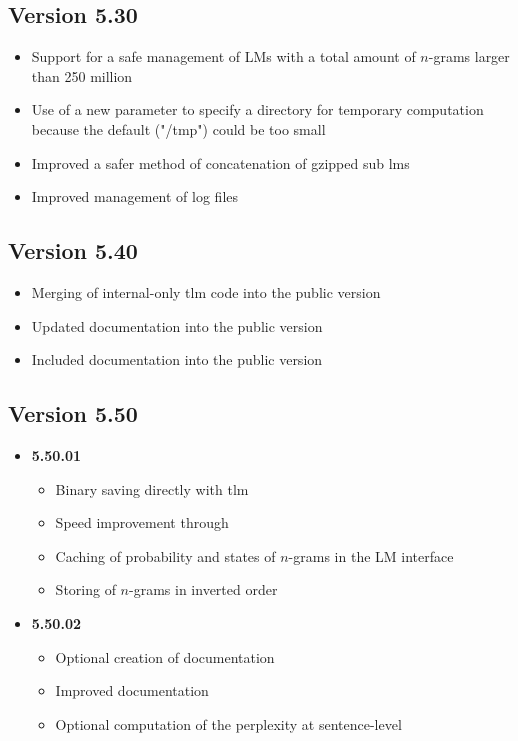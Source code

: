 \documentclass[11pt]{article}
\begin{document}
\subsection{Version 5.30}
\begin{itemize}
\item Support for a safe management of LMs with a total amount of $n$-grams larger than 250 million
\item Use of a new parameter to specify a directory for temporary computation because the default ("/tmp") could be too small
\item Improved a safer method of concatenation of gzipped sub lms
\item Improved management of log files
\end{itemize}

\subsection{Version 5.40}
\begin{itemize}
\item Merging of internal-only tlm code into the public version
\item Updated documentation into the public version
\item Included documentation into the public version
\end{itemize}

\subsection{Version 5.50}

\begin{itemize}
\item {\bf 5.50.01}
\begin{itemize}
\item Binary saving directly with tlm
\item Speed improvement through 
\item Caching of probability and states of $n$-grams in the LM interface
\item Storing of $n$-grams in inverted order
\end{itemize}

\item {\bf 5.50.02}
\begin{itemize}
\item Optional creation of documentation
\item Improved documentation
\item Optional computation of the perplexity at sentence-level
\end{itemize}

\end{itemize}
\end{document}
